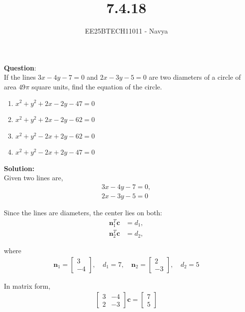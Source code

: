 \documentclass[journal]{IEEEtran}
\begin{document}

\vspace{3cm}

\title{7.4.18}
\author{EE25BTECH11011 - Navya}
{\let\newpage\relax\maketitle} 

\renewcommand{\thefigure}{\theenumi}
\renewcommand{\thetable}{\theenumi}
\setlength{\intextsep}{10pt} %
\textbf{Question}:\\
If the lines $3x-4y-7=0$ and $2x-3y-5=0$ are two diameters of a circle of area $49\pi$ square units, find the equation of the circle.

\begin{enumerate}
  \item $x^2+y^2+2x-2y-47=0$
  \item $x^2+y^2+2x-2y-62=0$
  \item $x^2+y^2-2x+2y-62=0$
  \item $x^2+y^2-2x+2y-47=0$
\end{enumerate}

\textbf{Solution:}\\
Given two lines are,
\begin{align}
3x - 4y - 7 = 0, \\
2x - 3y - 5 = 0
\end{align}

Since the lines are diameters, the center lies on both:
\begin{align}
\mathbf{n}_1^T \mathbf{c} &= d_1, \\
\mathbf{n}_2^T \mathbf{c} &= d_2,
\end{align}

where
\begin{align}
\mathbf{n}_1 = \begin{bmatrix} 3 \\ -4 \end{bmatrix}, \quad d_1 = 7, \quad
\mathbf{n}_2 = \begin{bmatrix} 2 \\ -3 \end{bmatrix}, \quad d_2 = 5
\end{align}


In matrix form,
\begin{align}
\begin{bmatrix}
3 & -4 \\
2 & -3
\end{bmatrix}
\mathbf{c} =
\begin{bmatrix}
7 \\
5
\end{bmatrix}
\end{align}
\end{document}
